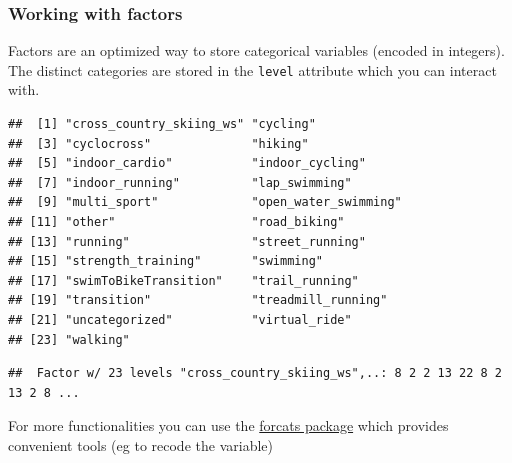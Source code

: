 \documentclass[
]{book}
\newenvironment{Shaded}{\begin{snugshade}}{\end{snugshade}}
\newcommand{\KeywordTok}[1]{\textcolor[rgb]{0.13,0.29,0.53}{\textbf{#1}}}
\newcommand{\NormalTok}[1]{#1}
\newcommand{\OperatorTok}[1]{\textcolor[rgb]{0.81,0.36,0.00}{\textbf{#1}}}
\newcommand{\StringTok}[1]{\textcolor[rgb]{0.31,0.60,0.02}{#1}}
\begin{document}
\hypertarget{working-with-factors}{%
\subsubsection{Working with factors}\label{working-with-factors}}

Factors are an optimized way to store categorical variables (encoded in integers). The distinct categories are stored in the \texttt{level} attribute which you can interact with.

\begin{Shaded}
\end{Shaded}

\begin{verbatim}
##  [1] "cross_country_skiing_ws" "cycling"                
##  [3] "cyclocross"              "hiking"                 
##  [5] "indoor_cardio"           "indoor_cycling"         
##  [7] "indoor_running"          "lap_swimming"           
##  [9] "multi_sport"             "open_water_swimming"    
## [11] "other"                   "road_biking"            
## [13] "running"                 "street_running"         
## [15] "strength_training"       "swimming"               
## [17] "swimToBikeTransition"    "trail_running"          
## [19] "transition"              "treadmill_running"      
## [21] "uncategorized"           "virtual_ride"           
## [23] "walking"
\end{verbatim}

\begin{Shaded}
\end{Shaded}

\begin{verbatim}
##  Factor w/ 23 levels "cross_country_skiing_ws",..: 8 2 2 13 22 8 2 13 2 8 ...
\end{verbatim}

For more functionalities you can use the \href{https://cran.r-project.org/web/packages/forcats/vignettes/forcats.html}{forcats package} which provides convenient tools (eg to recode the variable)
\end{document}
